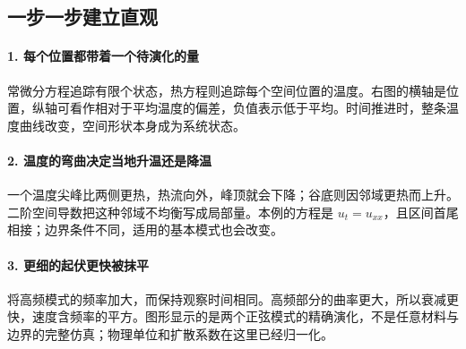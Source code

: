 \subsection*{一步一步建立直观}

\paragraph{1. 每个位置都带着一个待演化的量}

常微分方程追踪有限个状态，热方程则追踪每个空间位置的温度。右图的横轴是位置，纵轴可看作相对于平均温度的偏差，负值表示低于平均。时间推进时，整条温度曲线改变，空间形状本身成为系统状态。



\paragraph{2. 温度的弯曲决定当地升温还是降温}

一个温度尖峰比两侧更热，热流向外，峰顶就会下降；谷底则因邻域更热而上升。二阶空间导数把这种邻域不均衡写成局部量。本例的方程是 $u_t=u_{xx}$，且区间首尾相接；边界条件不同，适用的基本模式也会改变。



\paragraph{3. 更细的起伏更快被抹平}

将高频模式的频率加大，而保持观察时间相同。高频部分的曲率更大，所以衰减更快，速度含频率的平方。图形显示的是两个正弦模式的精确演化，不是任意材料与边界的完整仿真；物理单位和扩散系数在这里已经归一化。
